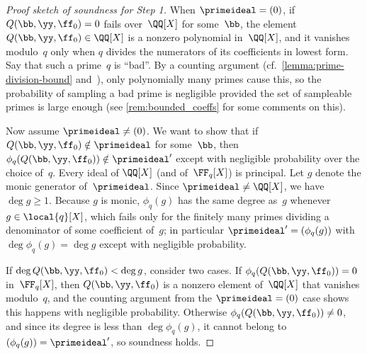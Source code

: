 \begin{proof}[Proof sketch of soundness for Step 1]
When $\primeideal=(0)$, if $Q(\bb,\yy,\ff_0) = 0$ fails over~$\QQ[X]$ for some~$\bb$, the element $Q(\bb,\yy,\ff_0)\in \QQ[X]$ is a nonzero polynomial in~$\QQ[X]$, and it vanishes modulo~$q$ only when $q$ divides the numerators of its coefficients in lowest form. Say that such a prime~$q$ is ``bad''.
By a counting argument (cf.\ \cref{lemma:prime-division-bound} and~\cite{Zinc}), only polynomially many primes cause this, so the probability of sampling a bad prime is negligible provided the set of sampleable primes is large enough (see \cref{rem:bounded_coeffs} for some comments on this).



Now assume $\primeideal\neq (0)$. We want to show that if $Q(\bb,\yy,\ff_0)\notin \primeideal$ for some~$\bb$, then $\phi_q(Q(\bb,\yy,\ff_0))\notin \primeideal'$ except with negligible probability over the choice of~$q$. Every ideal of $\QQ[X]$ (and of~$\FF_q[X]$) is principal. Let $g$ denote the monic generator of~$\primeideal$. Since $\primeideal\neq \QQ[X]$, we have $\deg g \geq 1$. Because $g$ is monic, $\phi_q(g)$ has the same degree as~$g$ whenever $g\in \local{q}[X]$, which fails only for the finitely many primes dividing a denominator of some coefficient of~$g$; in particular $\primeideal' = (\phi_q(g))$ with $\deg\phi_q(g)=\deg g$ except with negligible probability.

If $\deg Q(\bb,\yy,\ff_0) < \deg g$, consider two cases. If $\phi_q(Q(\bb,\yy,\ff_0))=0$ in~$\FF_q[X]$, then $Q(\bb,\yy,\ff_0)$ is a nonzero element of~$\QQ[X]$ that vanishes modulo~$q$, and the counting argument from the $\primeideal=(0)$ case shows this happens with negligible probability. Otherwise $\phi_q(Q(\bb,\yy,\ff_0))\neq 0$, and since its degree is less than $\deg\phi_q(g)$, it cannot belong to $(\phi_q(g))=\primeideal'$, so soundness holds.


\end{proof}
